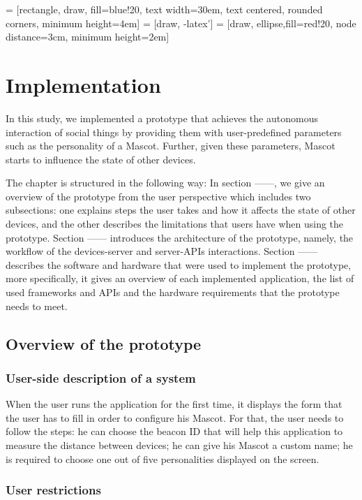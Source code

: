  = [rectangle, draw, fill=blue!20, 
    text width=30em, text centered, rounded corners, minimum height=4em]
 = [draw, -latex']
 = [draw, ellipse,fill=red!20, node distance=3cm,
    minimum height=2em]

\chapter{Implementation}

In this study, we implemented a prototype that achieves the autonomous interaction of social things by providing them with user-predefined parameters such as the personality of a Mascot. Further, given these parameters, Mascot starts to influence the state of other devices.

The chapter is structured in the following way: In section ------, we give an overview of the prototype from the user perspective which includes two subsections: one explains steps the user takes and how it affects the state of other devices, and the other describes the limitations that users have when using the prototype. Section ------ introduces the architecture of the prototype, namely, the workflow of the devices-server and server-APIs interactions. Section  ------ describes the software and hardware that were used to implement the prototype, more specifically, it gives an overview of each implemented application, the list of used frameworks and APIs and the hardware requirements that the prototype needs to meet.

\section{Overview of the prototype}

\subsection{User-side description of a system}
When the user runs the application for the first time, it displays the form that the user has to fill in order to configure his Mascot. For that, the user needs to follow the steps: he can choose the beacon ID that will help this application to measure the distance between devices; he can give his Mascot a custom name; he is required to choose one out of five personalities displayed on the screen.

\subsection{User restrictions}

